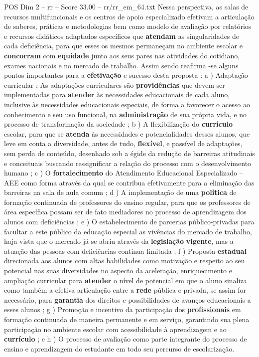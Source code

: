 \begin{textsample}{POS Dim 2 – rr – Score 33.00 – rr/rr\_em\_64.txt}
Nessa perspectiva, as salas de recursos multifuncionais e os centros de apoio especializado efetivam a articulação de saberes, práticas e metodologias bem como modelo de avaliação por relatórios e recursos didáticos adaptados específicos que \textbf{atendam} as singularidades de cada deficiência, para que esses os mesmos permaneçam no ambiente escolar e \textbf{concorram} com \textbf{equidade} junto aos seus pares nas atividades do cotidiano, exames nacionais e no mercado de trabalho.
Assim sendo reafirma -se alguns pontos importantes para a \textbf{efetivação} e sucesso desta proposta : a ) Adaptação curricular : As adaptações curriculares são \textbf{providências} que devem ser implementadas para \textbf{atender} às necessidades educacionais de cada aluno, inclusive às necessidades educacionais especiais, de forma a favorecer o acesso ao conhecimento e seu uso funcional, na \textbf{administração} de sua própria vida, e no processo de transformação da sociedade ; b ) A flexibilização do \textbf{currículo} escolar, para que se \textbf{atenda} às necessidades e potencialidades desses alunos, que leve em conta a diversidade, antes de tudo, \textbf{flexível}, e passível de adaptações, sem perda de conteúdo, desenhado sob a égide da redução de barreiras atitudinais e conceituais buscando ressignificar a relação do processo com o desenvolvimento humano ; c ) O \textbf{fortalecimento} do Atendimento Educacional Especializado – AEE como forma através da qual se contribua efetivamente para a eliminação das barreiras na sala de aula comum ; d ) A implementação de uma \textbf{política} de formação continuada de professores do ensino regular, para que os professores de área específica possam ser de fato mediadores no processo de aprendizagem dos alunos com deficiências ; e ) O estabelecimento de parcerias público-privadas para facultar a este público da educação especial as vivências do mercado de trabalho, haja vista que o mercado já se abriu através da \textbf{legislação} \textbf{vigente}, mas a atuação das pessoas com deficiências continua limitada ; f ) Proposta \textbf{estadual} direcionada aos alunos com altas habilidades como motivação e respeito ao seu potencial nas suas diversidades no aspecto da aceleração, enriquecimento e ampliação curricular para \textbf{atender} o nível de potencial em que o aluno sinaliza como também a efetiva articulação entre a \textbf{rede} pública e privada, se assim for necessário, para \textbf{garantia} dos direitos e possibilidades de avanços educacionais a esses alunos ; g ) Promoção e incentivo da participação dos \textbf{profissionais} em formação continuada de maneira permanente e em serviço, garantindo sua plena participação no ambiente escolar com acessibilidade à aprendizagem e ao \textbf{currículo} ; e h ) O processo de avaliação como parte integrante do processo de ensino e aprendizagem do estudante em todo seu percurso de escolarização.

\end{textsample}
